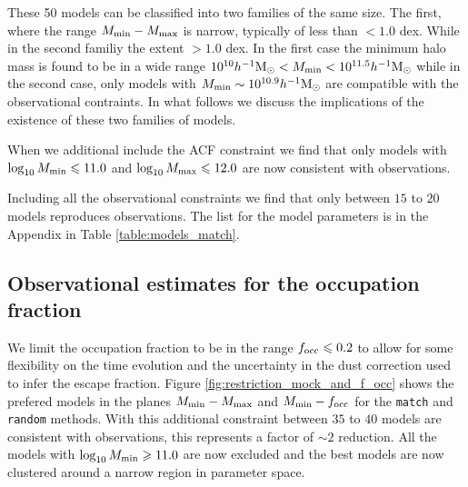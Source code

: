 \documentclass[usenatbib]{mn2e}
\newcommand{\hMsun}{{\ifmmode{h^{-1}{\rm {M_{\odot}}}}\else{$h^{-1}{\rm{M_{\odot}}}$}\fi}}
\begin{document}


These 50 models can be classified into two families of the same
size. The first, where the range $M_{\rm min}-M_{\rm max}$ is narrow,
typically of less than $<1.0$ dex. While in the second familiy the
extent $>1.0$ dex. In the first case the minimum halo mass is found to
be in a wide range $10^{10}\hMsun <M_{\rm min}< 10^{11.5}\hMsun$ while
in the second case, only models with $M_{\rm min}\sim 10^{10.9}\hMsun$
are compatible with the observational contraints. In what follows we
discuss the implications of the existence of these two families of
models.  

When we additional include the ACF constraint we find that only models with 
$\log_{10}M_{\rm min}\leq 11.0$ and $\log_{10}M_{\rm max}\leq 12.0$ 
are now consistent with observations.

Including all the observational constraints we find that only between $15$ to $20$ 
models reproduces observations. The list for the model parameters is in the
Appendix in Table \ref{table:models_match}.


\subsection{Observational estimates for the occupation fraction}



We limit the occupation fraction to
be in the range $f_{\rm  occ}\leq 0.2$ to allow for some flexibility on the time evolution
and the uncertainty in the dust correction used to infer the escape fraction. 
Figure  \ref{fig:restriction_mock_and_f_occ}  shows the prefered
models in the planes $M_{\rm min}-M_{\rm  max}$ and $M_{\rm
  min}-f_{\rm occ}$ for the {\tt match} and {\tt   random} methods.
With this additional constraint between $35$ to $40$ models are
consistent with observations, this represents a factor of $\sim 2$
reduction. All the models with $\log_{10}M_{\rm min}\geq 11.0$ are now
excluded and the best models are now clustered around a narrow region
in parameter space. %
\end{document}
